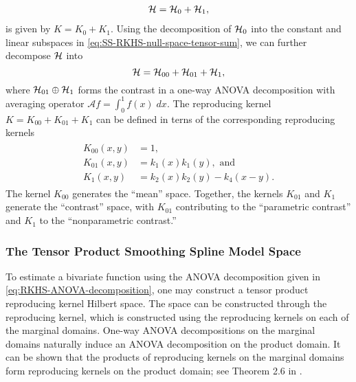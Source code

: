 \begin{align}\label{eq:SS-RKHS-as-tensor-sum}
\mathcal{H} = \mathcal{H}_0  + \mathcal{H}_1,
\end{align}
\noindent
is given by $K = K_0 + K_1$. Using the decomposition of $\mathcal{H}_0$ into the constant and linear subspaces in \eqref{eq:SS-RKHS-null-space-tensor-sum}, we can further decompose $\mathcal{H}$ into
\begin{equation}\label{eq:RKHS-ANOVA-decomposition}
\mathcal{H} = \mathcal{H}_{00}  +  \mathcal{H}_{01} + \mathcal{H}_1, 
\end{equation}
\noindent
where $ \mathcal{H}_{01} \oplus \mathcal{H}_1$ forms the contrast in a one-way ANOVA decomposition with averaging operator $\mathcal{A}f = \int_0^1 f\left(x\right)\;dx$. 
The reproducing kernel $K = K_{00} + K_{01} + K_1$ can be defined in terns of the corresponding reproducing kernels 
\begin{align}
\begin{split} \label{eq:cubic-spline-hilbert-space-rks}
K_{00}\left(x,y\right) &= 1,\\
K_{01}\left(x,y\right) &= k_1\left(x\right)k_1\left(y\right), \mbox{ and}\\
K_{1}\left(x,y\right) &= k_2\left(x\right)k_2\left(y\right) - k_4\left(x-y\right).
\end{split}
\end{align}
\noindent
The kernel $K_{00}$ generates the ``mean'' space. Together, the kernels $K_{01}$ and $K_{1}$ generate the ``contrast'' space, with $K_{01}$ contributing to the ``parametric contrast'' and $K_{1}$ to the ``nonparametric contrast.''

\subsubsection{The Tensor Product Smoothing Spline Model Space}

To estimate a bivariate function using the ANOVA decomposition given in \eqref{eq:RKHS-ANOVA-decomposition}, one may construct a tensor product reproducing kernel Hilbert space. The space can be constructed through the reproducing kernel, which is constructed using the reproducing kernels on each of the marginal domains. One-way ANOVA decompositions on the marginal domains naturally induce an ANOVA decomposition on the product domain. It can be shown that the products of reproducing kernels on the marginal domains form reproducing kernels on the product domain; see Theorem 2.6 in \cite{gu2013smoothing}.

